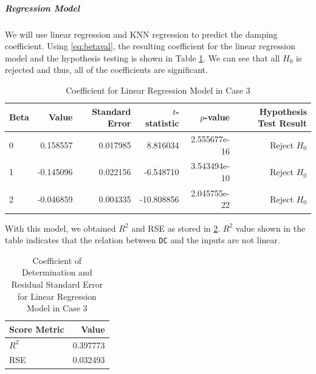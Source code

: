 \documentclass[conf]{new-aiaa}
\begin{document}
\subparagraph{Regression Model} We will use linear regression and KNN regression to predict the damping coefficient. Using \eqref{eq:betaval}, the resulting coefficient for the linear regression model and the hypothesis testing is shown in Table \ref{tab:case3_beta_val}. We can see that all $H_0$ is rejected and thus, all of the coefficients are significant. 
\begin{table}[H]
    \centering
    \caption{\label{tab:case3_beta_val}Coefficient for Linear Regression Model in Case 3}
    \begin{tabular}{lrrrrr}
        \toprule
        Beta &      Value &  Standard Error &  $t$-statistic &       $p$-value & Hypothesis Test Result \\
        \midrule
        0 &  0.158557 &        0.017985 &     8.816034 &  2.555677e-16 &              Reject $H_0$ \\
        1 & -0.145096 &        0.022156 &    -6.548710 &  3.543494e-10 &              Reject $H_0$ \\
        2 & -0.046859 &        0.004335 &   -10.808856 &  2.045755e-22 &              Reject $H_0$ \\
        \bottomrule
    \end{tabular}
\end{table}
With this model, we obtained $R^2$ and RSE as stored in \ref{tab:case3_r2_rse_lr}. $R^2$ value shown in the table indicates that the relation between \texttt{DC} and the inputs are not linear.
\begin{table}[H]
    \centering
    \caption{\label{tab:case3_r2_rse_lr}Coefficient of Determination and Residual Standard Error for Linear Regression Model in Case 3}
    \begin{tabular}{lr}
        \toprule
        Score Metric &      Value \\
        \midrule
        $R^2$ &      0.397773 \\
        RSE &        0.032493 \\
        \bottomrule
    \end{tabular}
\end{table}
\end{document}
